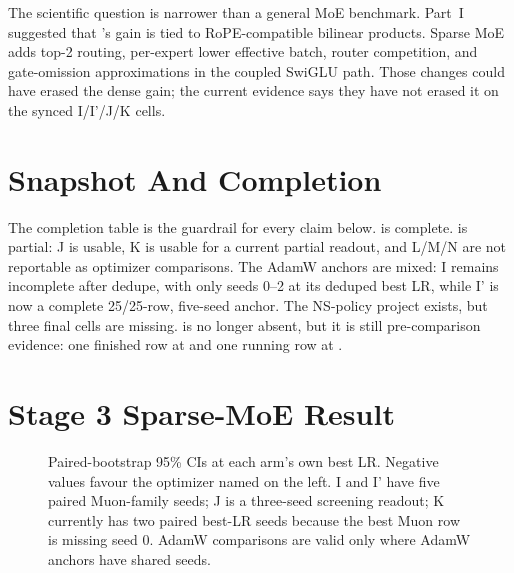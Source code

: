 \documentclass[11pt,a4paper]{article}
\begin{document}
The scientific question is narrower than a general MoE benchmark. Part~I suggested that \optCoupled{}'s gain is tied to RoPE-compatible bilinear products. Sparse MoE adds top-2 routing, per-expert lower effective batch, router competition, and gate-omission approximations in the coupled SwiGLU path. Those changes could have erased the dense gain; the current evidence says they have not erased it on the synced I/I'/J/K cells.

\section{Snapshot And Completion}

\begin{table}[h]
\centering
\scriptsize
{}
\caption{Part~II completion matrix from the 2026-05-19 W\&B snapshot. ``Final cells'' are deduped, finished rows with non-null  and parsed seed. Missing future Phase-2 projects are evidence gaps, not zero-effect results.}\label{tab:part2-completion}
\end{table}

The completion table is the guardrail for every claim below.  is complete.  is partial: J is usable, K is usable for a current partial readout, and L/M/N are not reportable as optimizer comparisons. The AdamW anchors are mixed: I remains incomplete after dedupe, with only seeds 0--2 at its deduped best LR, while I' is now a complete 25/25-row, five-seed anchor. The NS-policy project exists, but three final cells are missing.  is no longer absent, but it is still pre-comparison evidence: one finished  \optCoupled{} row at  and one running row at .

\section{Stage 3 Sparse-MoE Result}

\begin{figure}[h]
\centering
{}
\caption{Paired-bootstrap 95\% CIs at each arm's own best LR. Negative values favour the optimizer named on the left. I and I' have five paired Muon-family seeds; J is a three-seed screening readout; K currently has two paired best-LR seeds because the best Muon row is missing seed 0. AdamW comparisons are valid only where AdamW anchors have shared seeds.}\label{fig:part2-stage3-forest}
\end{figure}
\end{document}
